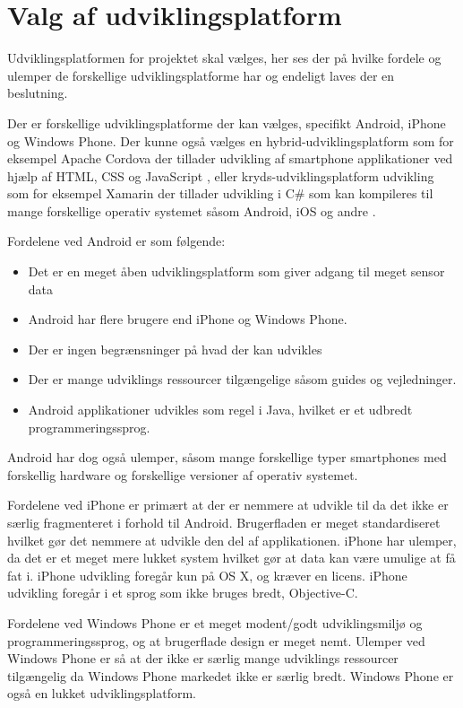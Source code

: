 \section{Valg af udviklingsplatform}\label{sec:valg_af_android}
Udviklingsplatformen for projektet skal vælges, her ses der på hvilke fordele og ulemper de forskellige udviklingsplatforme har og endeligt laves der en beslutning.

Der er forskellige udviklingsplatforme der kan vælges, specifikt Android, iPhone og Windows Phone.
Der kunne også vælges en hybrid-udviklingsplatform som for eksempel Apache Cordova der tillader udvikling af smartphone applikationer ved hjælp af HTML, CSS og JavaScript \citep{misc:apachecordova}, eller kryds-udviklingsplatform udvikling som for eksempel Xamarin der tillader udvikling i C\# som kan kompileres til mange forskellige operativ systemet såsom Android, iOS og andre \citep{misc:xamarin}.

Fordelene ved Android er som følgende:
\begin{itemize}
\item Det er en meget åben udviklingsplatform som giver adgang til meget sensor data
\item Android har flere brugere end iPhone og Windows Phone.
\item Der er ingen begrænsninger på hvad der kan udvikles
\item Der er mange udviklings ressourcer tilgængelige såsom guides og vejledninger.
\item Android applikationer udvikles som regel i Java, hvilket er et udbredt programmeringssprog.
\end{itemize}

Android har dog også ulemper, såsom mange forskellige typer smartphones med forskellig hardware og forskellige versioner af operativ systemet.

Fordelene ved iPhone er primært at der er nemmere at udvikle til da det ikke er særlig fragmenteret i forhold til Android. 
Brugerfladen er meget standardiseret hvilket gør det nemmere at udvikle den del af applikationen. 
iPhone har ulemper, da det er et meget mere lukket system hvilket gør at data kan være umulige at få fat i. iPhone udvikling foregår kun på OS X, og kræver en licens. iPhone udvikling foregår i et sprog som ikke bruges bredt, Objective-C.

Fordelene ved Windows Phone er et meget modent/godt udviklingsmiljø og programmeringssprog, og at brugerflade design er meget nemt. 
Ulemper ved Windows Phone er så at der ikke er særlig mange udviklings ressourcer tilgængelig da Windows Phone markedet ikke er særlig bredt. Windows Phone er også en lukket udviklingsplatform.

